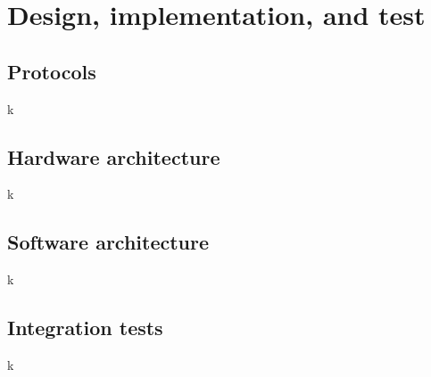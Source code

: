 \chapter{Design, implementation, and test}

\section{Protocols}
k

\section{Hardware architecture}
k

\section{Software architecture}
k

\section{Integration tests}
k